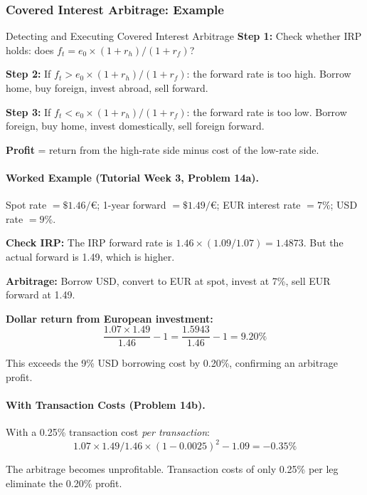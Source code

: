 \documentclass[11pt,a4paper]{article}
\begin{document}
\subsubsection{Covered Interest Arbitrage: Example}

\begin{methodbox}{Detecting and Executing Covered Interest Arbitrage}
\textbf{Step 1:} Check whether IRP holds: does $f_t = e_0 \times (1+r_h)/(1+r_f)$?

\textbf{Step 2:} If $f_t > e_0 \times (1+r_h)/(1+r_f)$: the forward rate is too high. Borrow home, buy foreign, invest abroad, sell forward.

\textbf{Step 3:} If $f_t < e_0 \times (1+r_h)/(1+r_f)$: the forward rate is too low. Borrow foreign, buy home, invest domestically, sell foreign forward.

\textbf{Profit} = return from the high-rate side minus cost of the low-rate side.
\end{methodbox}

\paragraph{Worked Example (Tutorial Week 3, Problem 14a).}

Spot rate $= \$1.46/\text{€}$; 1-year forward $= \$1.49/\text{€}$; EUR interest rate $= 7\%$; USD rate $= 9\%$.

\textbf{Check IRP:} The IRP forward rate is $1.46 \times (1.09/1.07) = 1.4873$. But the actual forward is 1.49, which is higher.

\textbf{Arbitrage:} Borrow USD, convert to EUR at spot, invest at 7\%, sell EUR forward at 1.49.

\textbf{Dollar return from European investment:}
\[
  \frac{1.07 \times 1.49}{1.46} - 1 = \frac{1.5943}{1.46} - 1 = 9.20\%
\]

This exceeds the 9\% USD borrowing cost by 0.20\%, confirming an arbitrage profit.

\paragraph{With Transaction Costs (Problem 14b).}

With a 0.25\% transaction cost \textit{per transaction}:
\[
  1.07 \times 1.49 / 1.46 \times (1 - 0.0025)^2 - 1.09 = -0.35\%
\]

The arbitrage becomes unprofitable. Transaction costs of only 0.25\% per leg eliminate the 0.20\% profit.
\end{document}
